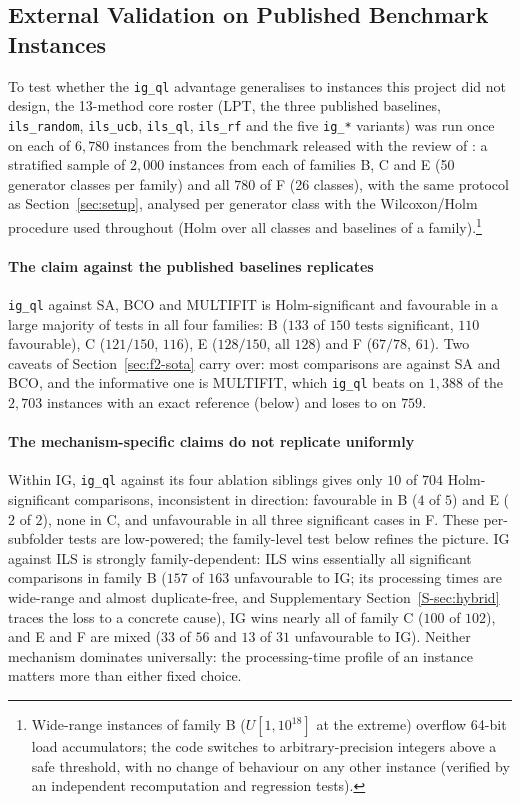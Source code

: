 \documentclass[final,3p,times,11pt,authoryear]{elsarticle}
\begin{document}


\subsection{External Validation on Published Benchmark Instances}
\label{sec:external}

To test whether the \texttt{ig\_ql} advantage generalises to instances
this project did not design, the 13-method core roster (LPT, the three
published baselines, \texttt{ils\_random}, \texttt{ils\_ucb},
\texttt{ils\_ql}, \texttt{ils\_rf} and the five \texttt{ig\_*} variants)
was run once on each of $6{,}780$ instances from the benchmark released
with the review of \citet{OstojicEtAl2025}: a stratified sample of
$2{,}000$ instances from each of families B, C and E (50 generator
classes per family) and all $780$ of F (26 classes), with the same
protocol as Section~\ref{sec:setup}, analysed per generator class with the
Wilcoxon/Holm procedure used throughout (Holm over all classes and
baselines of a family).\footnote{Wide-range instances of family B
($U[1,10^{18}]$ at the extreme) overflow 64-bit load accumulators; the
code switches to arbitrary-precision integers above a safe threshold, with
no change of behaviour on any other instance (verified by an independent
recomputation and regression tests).}

\paragraph{The claim against the published baselines replicates}
\texttt{ig\_ql} against SA, BCO and MULTIFIT is Holm-significant and
favourable in a large majority of tests in all four families: B ($133$ of
$150$ tests significant, $110$ favourable), C ($121/150$, $116$), E
($128/150$, all $128$) and F ($67/78$, $61$). Two caveats of
Section~\ref{sec:f2-sota} carry over: most comparisons are against SA and
BCO, and the informative one is MULTIFIT, which \texttt{ig\_ql} beats on
$1{,}388$ of the $2{,}703$ instances with an exact reference (below) and
loses to on $759$.

\paragraph{The mechanism-specific claims do not replicate uniformly}
Within IG, \texttt{ig\_ql} against its four ablation siblings gives only
$10$ of $704$ Holm-significant comparisons, inconsistent in direction:
favourable in B ($4$ of $5$) and E ($2$ of $2$), none in C, and
unfavourable in all three significant cases in F. These per-subfolder
tests are low-powered; the family-level test below refines the picture.
IG against ILS is strongly family-dependent: ILS wins essentially all
significant comparisons in family B ($157$ of $163$ unfavourable to IG;
its processing times are wide-range and almost duplicate-free, and
Supplementary Section~\ref{S-sec:hybrid} traces the loss to a concrete
cause), IG wins nearly all of family C ($100$ of $102$), and E and F are
mixed ($33$ of $56$ and $13$ of $31$ unfavourable to IG). Neither
mechanism dominates universally: the processing-time profile of an
instance matters more than either fixed choice.
\end{document}
